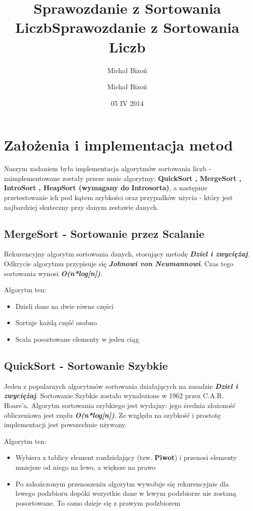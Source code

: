 \documentclass[12pt,a4paper,oneside]{article}
\author{Michał Bizoń}
\title{Sprawozdanie z Sortowania Liczb}
\begin{document}
\title{Sprawozdanie z Sortowania Liczb}
\author{Michał Bizoń}
\date{05 IV 2014}
\maketitle

\section{Założenia i implementacja metod}
Naszym zadaniem była implementacja algorytmów sortowania liczb - zaimplementowane zostały przeze mnie algorytmy: \textbf{QuickSort , MergeSort , IntroSort , HeapSort (wymagany do Introsorta)}, a następnie przetestowanie ich pod kątem szybkości oraz przypadków użycia - który jest najbardziej skuteczny przy danym zestawie danych.

\subsection{MergeSort - Sortowanie przez Scalanie}
Rekurencyjny algorytm sortowania danych, stosujący metodę \textbf{\emph{Dziel i zwyciężaj}}. Odkrycie algorytmu przypisuje się \textbf{\emph{Johnowi von Neumannowi}}. Czas tego sortowania wynosi \textbf{\emph{O(n*log[n])}}.

Algorytm ten:
\begin{itemize}
	\item Dzieli dane na dwie równe części
	\item Sortuje każdą część osobno
	\item Scala posortowane elementy w jeden ciąg
\end{itemize}

\subsection{QuickSort - Sortowanie Szybkie}
Jeden z popularnych algorytmów sortowania działających na zasadzie \textbf{\emph{Dziel i zwyciężaj}}. Sortowanie Szybkie zostało wynalezione w 1962 przez C.A.R. Hoare'a. Algorytm sortowania szybkiego jest wydajny: jego średnia złożoność obliczeniowa jest rzędu \textbf{\emph{O(n*log[n])}}. Ze względu na szybkość i prostotę implementacji jest powszechnie używany.

Algorytm ten:

\begin{itemize}
	\item Wybiera z tablicy element rozdzielający (tzw. \textbf{Piwot}) i przenosi elementy mniejsze od niego na lewo, a większe na prawo
	\item Po zakończonym przenoszeniu algorytm wywołuje się rekurencyjnie dla lewego podzbioru dopóki wszystkie dane w lewym podzbiorze nie zostaną posortowane. To samo dzieje się z prawym podzbiorem
\end{itemize}
\end{document}

